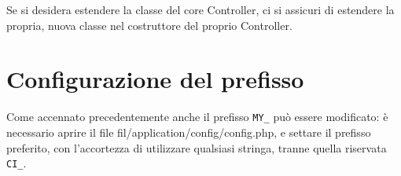 Se si desidera estendere la classe del core Controller, ci si assicuri di estendere la propria, nuova classe nel costruttore del proprio Controller.


\section*{Configurazione del prefisso}
Come accennato precedentemente anche il prefisso \verb|MY_| può essere modificato: è necessario aprire il file fil{/application/config/config.php}, e settare il prefisso preferito, con l'accortezza di utilizzare qualsiasi stringa, tranne quella riservata \verb|CI_|.


